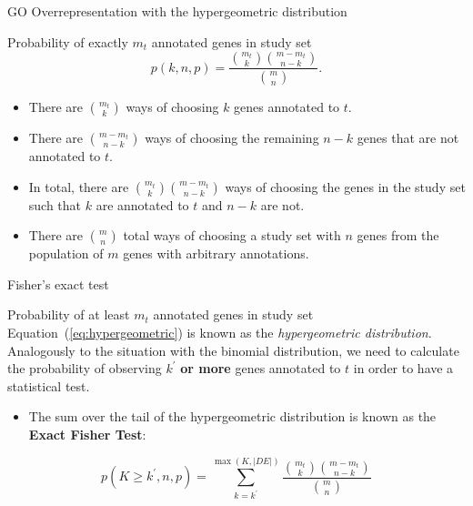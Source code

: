 \documentclass{beamer}
\begin{document}
\begin{frame}{GO Overrepresentation with the hypergeometric distribution}
\begin{mybluebox}{Probability of exactly $m_t$ annotated genes in study set}
 \begin{equation}
p(k,n,p)  = \dfrac{\binom{m_t}{k}\binom{m-m_t}{n-k}}{\binom{m}{n}}.
\end{equation}
\end{mybluebox}

\begin{itemize}
 \item There are $\binom{m_t}{k}$ ways of
choosing $k$ genes annotated to $t$.
\item There are $\binom{m-m_t}{n-k}$
ways of choosing the remaining $n-k$ genes that are not annotated to
$t$.
\item   In total, there are $\binom{m_t}{k}\binom{m-m_t}{n-k}$ ways of
choosing the genes in the study set such that $k$ are annotated to $t$
and $n-k$ are not. 
\item There are $\binom{m}{n}$ total ways of choosing a
study set with $n$ genes from the population of $m$ genes with
arbitrary annotations.
\end{itemize}


 
\end{frame}

\begin{frame}{Fisher's exact test}
\begin{mybluebox}{Probability of at least $m_t$ annotated genes in study set}
Equation~(\ref{eq:hypergeometric}) is known as the \textit{hypergeometric
distribution}. Analogously to the situation with the binomial
distribution, we need to calculate the probability of observing  $k^{'}$ {\bf or more} genes annotated to $t$ in order to have a
statistical test. 
\end{mybluebox}
 \begin{itemize}
 \item The sum over the tail of the
hypergeometric distribution is known as the \textbf{Exact Fisher
  Test}:
 \end{itemize}

\begin{equation}
 \label{eq:exactFisher}
p(K\geq k^{'},n,p) = 
\sum_{k=k^{'}}^{\max(K,|DE|)}\dfrac{\binom{m_t}{k}\binom{m-m_t}{n-k}}{\binom{m}{n}}
\end{equation}
 
 
\end{frame}
\end{document}
